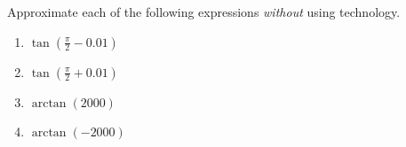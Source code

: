 \documentclass{ximera}
\begin{document}
\begin{question} \label{Q45rghREERwer}
Approximate each of the following expressions \emph{without} using technology.
\begin{enumerate}
\item $\tan \left(\frac{\pi}{2} - 0.01\right)$

\item $\tan \left(\frac{\pi}{2} + 0.01 \right)$

\item $\arctan(2000)$

\item $\arctan(-2000)$
\end{enumerate}

\end{question}
\end{document}
